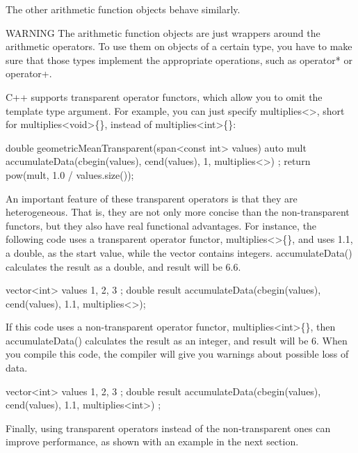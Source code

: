 The other arithmetic function objects behave similarly.

\begin{myWarning}{WARNING}
The arithmetic function objects are just wrappers around the arithmetic operators. To use them on objects of a certain type, you have to make sure that those types implement the appropriate operations, such as operator* or operator+.
\end{myWarning}


C++ supports transparent operator functors, which allow you to omit the template type argument. For example, you can just specify multiplies<>{}, short for multiplies<void>\{\}, instead of multiplies<int>\{\}:

\begin{cpp}
double geometricMeanTransparent(span<const int> values)
{
    auto mult { accumulateData(cbegin(values), cend(values), 1, multiplies<>{}) };
    return pow(mult, 1.0 / values.size());
}
\end{cpp}

An important feature of these transparent operators is that they are heterogeneous. That is, they are not only more concise than the non-transparent functors, but they also have real functional advantages. For instance, the following code uses a transparent operator functor, multiplies<>\{\}, and uses 1.1, a double, as the start value, while the vector contains integers. accumulateData() calculates the result as a double, and result will be 6.6.

\begin{cpp}
vector<int> values { 1, 2, 3 };
double result {accumulateData(cbegin(values), cend(values), 1.1, multiplies<>{})};
\end{cpp}

If this code uses a non-transparent operator functor, multiplies<int>\{\}, then accumulateData() calculates the result as an integer, and result will be 6. When you compile this code, the compiler will give you warnings about possible loss of data.

\begin{cpp}
vector<int> values { 1, 2, 3 };
double result {
    accumulateData(cbegin(values), cend(values), 1.1, multiplies<int>{}) };
\end{cpp}

Finally, using transparent operators instead of the non-transparent ones can improve performance, as shown with an example in the next section.


